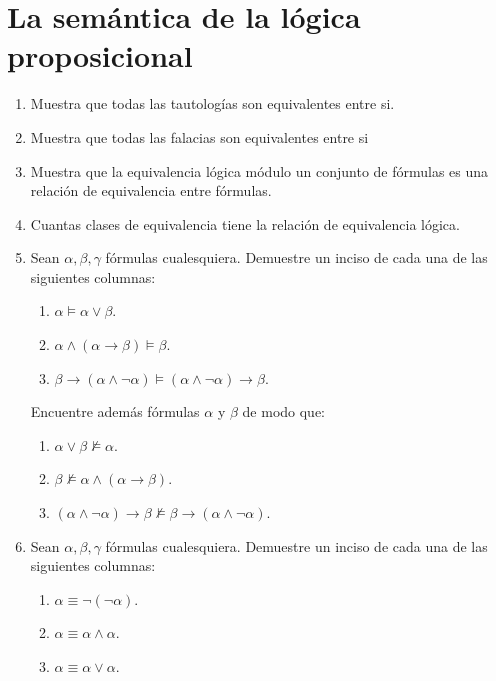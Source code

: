 \documentclass[letterpaper,DIV=15,headsepline,12pt]{scrartcl}
\begin{document}
    \section*{La semántica de la lógica proposicional}
        \begin{enumerate}
            \item Muestra que todas las tautologías son equivalentes entre si.
            \item Muestra que todas las falacias son equivalentes entre si
            \item Muestra que la equivalencia lógica módulo un conjunto de fórmulas es una relación de equivalencia entre fórmulas.
            \item Cuantas clases de equivalencia tiene la relación de equivalencia lógica.
            
            \item Sean $\alpha, \beta, \gamma$ fórmulas cualesquiera. Demuestre un inciso de cada una de las siguientes columnas:
            \begin{multicols}{3}
            \begin{enumerate}
                \item $\alpha \vDash \alpha \lor \beta$.
                \item $\alpha \land (\alpha \to \beta) \vDash \beta $.
                \item $\beta \to (\alpha \land \lnot \alpha) \vDash (\alpha \land \lnot \alpha) \to \beta$.
            \end{enumerate}
            \end{multicols}
            Encuentre además fórmulas $\alpha$ y $\beta$ de modo que:
            \begin{multicols}{3}
            \begin{enumerate}
                \item $\alpha \lor \beta \not\vDash \alpha$.
                \item $\beta \not \vDash \alpha \land (\alpha \to \beta)$.
                \item $(\alpha \land \lnot \alpha) \to \beta \not\vDash \beta \to (\alpha \land \lnot \alpha)$.
            \end{enumerate}
            \end{multicols}
            
            \item Sean $\alpha, \beta, \gamma$ fórmulas cualesquiera. Demuestre un inciso de cada una de las siguientes columnas:
            \begin{multicols}{3}
            \begin{enumerate}
                \item $\alpha \equiv \lnot ( \lnot \alpha )$.
                \item $\alpha \equiv \alpha \land \alpha$.
                \item $\alpha \equiv \alpha \lor \alpha$.
                

\end{enumerate}
\end{multicols}
\end{enumerate}
\end{document}
